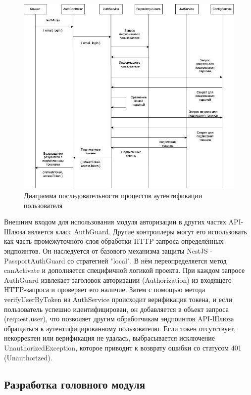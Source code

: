 	\begin{figure}[ht!] 
		\center
		\includegraphics [scale=0.37] {my_folder/images//login_processes}
		\caption{Диаграмма последовательности процессов аутентификации пользователя} 
		\label{fig:login_processes}  
	\end{figure}

	Внешним входом для использования модуля авторизации в других частях API-Шлюза является класс AuthGuard. Другие контроллеры могут его использовать как часть промежуточного слоя обработки HTTP запроса определённых эндпоинтов. Он наследуется от базового механизма защиты NestJS - PassportAuthGuard со стратегией "local". В нём переопределяется метод canActivate и дополняется специфичной логикой проекта. При каждом запросе AuthGuard извлекает заголовок авторизации (Authorization) из входящего HTTP-запроса и проверяет его наличие. Затем с помощью метода verifyUserByToken из AuthService происходит верификация токена, и если пользователь успешно идентифицирован, он добавляется в объект запроса (request.user), что позволяет другим обработчикам эндпоинтов API-Шлюза обращаться к аутентифицированному пользователю. Если токен отсутствует, некорректен или верификация не удалась, выбрасывается исключение UnauthorizedException, которое приводит к возврату ошибки со статусом 401 (Unauthorized).

	\subsection{Разработка головного модуля}

